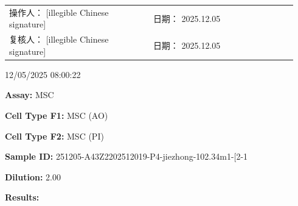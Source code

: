 \documentclass[UTF8,10pt,a4paper,fontset=fandol]{ctexart}
\newcommand{\fieldvalue}[1]{#1}
\newcommand{\handwritten}[1]{#1}
\begin{document}
\vfill

\begin{tabular}{@{}p{0.47\linewidth}p{0.47\linewidth}@{}}
操作人：
\fieldvalue{\handwritten{[illegible Chinese signature]}}
&
日期：
\fieldvalue{\handwritten{2025.12.05}}
\\[1em]
复核人：
\fieldvalue{\handwritten{[illegible Chinese signature]}}
&
日期：
\fieldvalue{\handwritten{2025.12.05}}
\end{tabular}

\newpage

\noindent
\fieldvalue{12/05/2025 08:00:22}

\vspace{0.5em}

\textbf{Assay:} \fieldvalue{MSC}

\textbf{Cell Type F1:} \fieldvalue{MSC (AO)}

\textbf{Cell Type F2:} \fieldvalue{MSC (PI)}

\textbf{Sample ID:} \fieldvalue{251205-A43Z2202512019-P4-jiezhong-102.34m1-[2-1}

\textbf{Dilution:} \fieldvalue{2.00}

\vspace{0.8em}
\noindent\textbf{Results:}
\end{document}
